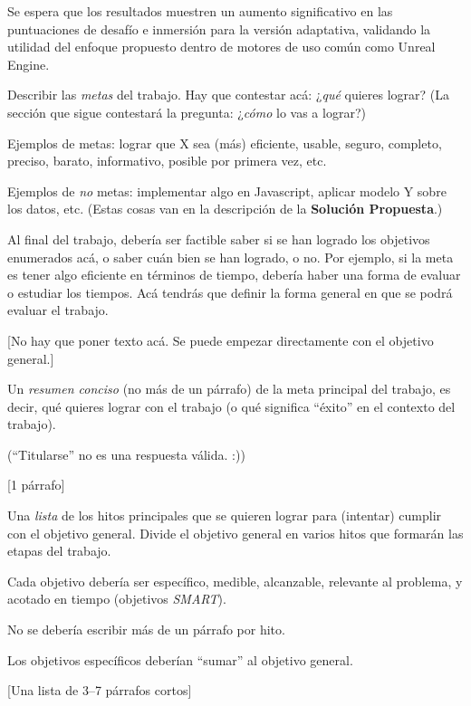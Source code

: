 \documentclass[informe]{upropuesta}
\begin{document}
Se espera que los resultados muestren un aumento significativo en las puntuaciones de desafío e inmersión para la versión adaptativa, validando la utilidad del enfoque propuesto dentro de motores de uso común como Unreal Engine.


\begin{pauta}
Describir las \textit{metas} del trabajo. Hay que contestar acá: ¿\textit{qué} quieres lograr? (La sección que sigue contestará la pregunta: ¿\textit{cómo} lo vas a lograr?)

Ejemplos de metas: lograr que X sea (más) eficiente, usable, seguro, completo, preciso, barato, informativo, posible por primera vez, etc.

Ejemplos de \textit{no} metas: implementar algo en Javascript, aplicar modelo Y sobre los datos, etc. (Estas cosas van en la descripción de la \textbf{Solución Propuesta}.)

Al final del trabajo, debería ser factible saber si se han logrado los objetivos enumerados acá, o saber cuán bien se han logrado, o no. Por ejemplo, si la meta es tener algo eficiente en términos de tiempo, debería haber una forma de evaluar o estudiar los tiempos. Acá tendrás que definir la forma general en que se podrá evaluar el trabajo.

[No hay que poner texto acá. Se puede empezar directamente con el objetivo general.]
\end{pauta}


  
\begin{pauta}
Un \textit{resumen conciso} (no más de un párrafo) de la meta principal del trabajo, es decir, qué quieres lograr con el trabajo (o qué significa ``éxito'' en el contexto del trabajo).
  
(``Titularse'' no es una respuesta válida. :))
  
[1 párrafo]
\end{pauta}

  
\begin{pauta}
Una \textit{lista} de los hitos principales que se quieren lograr para (intentar) cumplir con el objetivo general. Divide el objetivo general en varios hitos que formarán las etapas del trabajo.
  
Cada objetivo debería ser específico, medible, alcanzable, relevante al problema, y acotado en tiempo (objetivos \textit{SMART}).

No se debería escribir más de un párrafo por hito. 

Los objetivos específicos deberían ``sumar'' al objetivo general.
  
[Una lista de 3--7 párrafos cortos]
\end{pauta}
  
\end{document}
